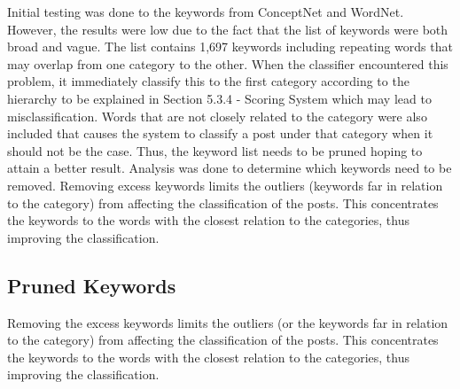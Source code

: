 Initial testing was done to the keywords from ConceptNet and WordNet. However, the results were low due to the fact that the list of keywords were both broad and vague. The list contains 1,697 keywords including repeating words that may overlap from one category to the other. When the classifier encountered this problem, it immediately classify this to the first category according to the hierarchy to be explained in Section 5.3.4 - Scoring System which may lead to misclassification. Words that are not closely related to the category were also included that causes the system to classify a post under that category when it should not be the case. Thus, the keyword list needs to be pruned hoping to attain a better result. Analysis was done to determine which keywords need to be removed. Removing excess keywords limits the outliers (keywords far in relation to the category) from affecting the classification of the posts. This concentrates the keywords to the words with the closest relation to the categories, thus improving the classification.

\subsection{Pruned Keywords}
Removing the excess keywords limits the outliers (or the keywords far in relation to the category) from affecting the classification of the posts. This concentrates the keywords to the words with the closest relation to the categories, thus improving the classification.

